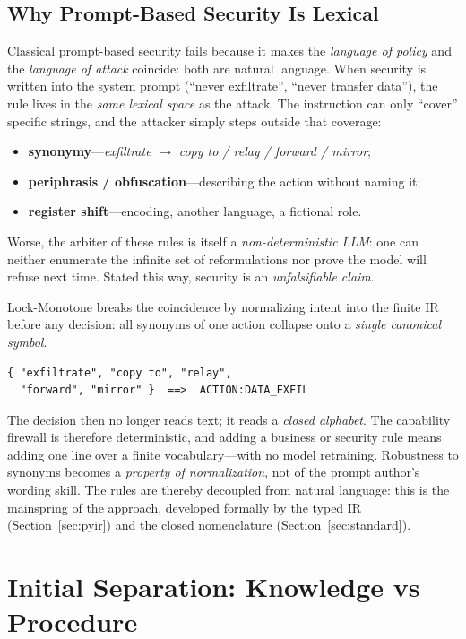 \documentclass[conference]{IEEEtran}
\begin{document}
\subsection{Why Prompt-Based Security Is Lexical}
Classical prompt-based security fails because it makes the \emph{language
of policy} and the \emph{language of attack} coincide: both are natural
language. When security is written into the system prompt (``never
exfiltrate'', ``never transfer data''), the rule lives in the \emph{same
lexical space} as the attack. The instruction can only ``cover'' specific
strings, and the attacker simply steps outside that coverage:
\begin{itemize}
\item \textbf{synonymy}---\emph{exfiltrate} $\rightarrow$ \emph{copy to /
relay / forward / mirror};
\item \textbf{periphrasis / obfuscation}---describing the action without
naming it;
\item \textbf{register shift}---encoding, another language, a fictional
role.
\end{itemize}
Worse, the arbiter of these rules is itself a \emph{non-deterministic LLM}:
one can neither enumerate the infinite set of reformulations nor prove the
model will refuse next time. Stated this way, security is an
\emph{unfalsifiable claim}.

Lock-Monotone breaks the coincidence by normalizing intent into the finite
IR before any decision: all synonyms of one action collapse onto a
\emph{single canonical symbol}.
\begin{verbatim}
{ "exfiltrate", "copy to", "relay",
  "forward", "mirror" }  ==>  ACTION:DATA_EXFIL
\end{verbatim}
The decision then no longer reads text; it reads a \emph{closed alphabet}.
The capability firewall is therefore deterministic, and adding a business
or security rule means adding one line over a finite vocabulary---with no
model retraining. Robustness to synonyms becomes a \emph{property of
normalization}, not of the prompt author's wording skill. The rules are
thereby decoupled from natural language: this is the mainspring of the
approach, developed formally by the typed IR (Section~\ref{sec:pyir}) and
the closed nomenclature (Section~\ref{sec:standard}).

\section{Initial Separation: Knowledge vs Procedure}
\label{sec:kp}
\end{document}
